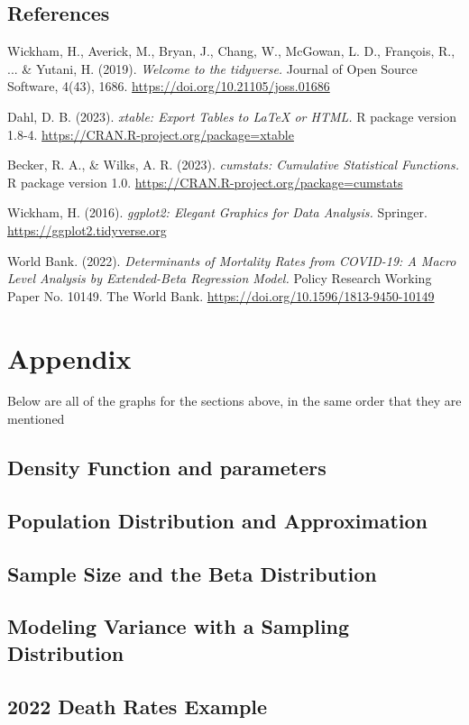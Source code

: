 \documentclass{article}\usepackage[]{graphicx}\usepackage[]{xcolor}
\begin{document}
\begin{multicols}{2}
\vspace{2em}
\begin{tiny}

\section{References}

Wickham, H., Averick, M., Bryan, J., Chang, W., McGowan, L. D., François, R., ... \& Yutani, H. (2019).  
\textit{Welcome to the tidyverse.} Journal of Open Source Software, 4(43), 1686.  
\url{https://doi.org/10.21105/joss.01686}  

Dahl, D. B. (2023). \textit{xtable: Export Tables to LaTeX or HTML.} R package version 1.8-4.  
\url{https://CRAN.R-project.org/package=xtable}  

Becker, R. A., \& Wilks, A. R. (2023). \textit{cumstats: Cumulative Statistical Functions.}  
R package version 1.0. \url{https://CRAN.R-project.org/package=cumstats}  

Wickham, H. (2016). \textit{ggplot2: Elegant Graphics for Data Analysis.} Springer.  
\url{https://ggplot2.tidyverse.org}  

World Bank. (2022). \textit{Determinants of Mortality Rates from COVID-19: A Macro Level Analysis by Extended-Beta Regression Model.}  
Policy Research Working Paper No. 10149. The World Bank.  
\url{https://doi.org/10.1596/1813-9450-10149}  


\end{tiny}
\end{multicols}

\newpage
\onecolumn
\section{Appendix}
Below are all of the graphs for the sections above, in the same order that they are mentioned
\subsection{Density Function and parameters}

\subsection{Population Distribution and Approximation}

\subsection{Sample Size and the Beta Distribution}

\subsection{Modeling Variance with a Sampling Distribution}

\subsection{2022 Death Rates Example}
\end{document}
